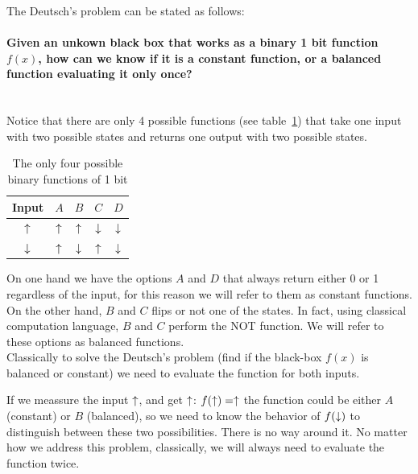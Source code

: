 The Deutsch's problem can be stated as follows:

\paragraph{Given an unkown black box that works as a binary 1 bit function $f(x)$, how can we know if it is a constant function, or a balanced function evaluating it only once?\\}
\textcolor{white}{.}\\
Notice that there are only 4 possible functions (see table~\ref{binfunc}) that take one input with two possible states and returns one output with two possible states.
\begin{table}[h!]
\begin{center}
\begin{tabular}{c|c|c|c|c}
\multicolumn{1}{l|}{Input} & \multicolumn{1}{l|}{$A$} & \multicolumn{1}{l|}{$B$} & \multicolumn{1}{l|}{$C$} & \multicolumn{1}{l}{$D$} \\ \hline
$\uparrow$ & $\uparrow$ & $\uparrow$ & $\downarrow$ & $\downarrow$ \\ %
$\downarrow$ & $\uparrow$ & $\downarrow$ & $\uparrow$ & $\downarrow$ \\ %
\end{tabular}
\end{center}
\vspace{-15pt}\caption{The only four possible binary functions of 1 bit}
\label{binfunc}
\end{table}

On one hand we have the options $A$ and $D$ that always return either 0 or 1 regardless of the input, for this reason we will refer to them as constant functions.
On the other hand, $B$ and $C$ flips or not one of the states. In fact, using classical computation language, $B$ and $C$ perform the NOT function. We will refer to these options as balanced functions.\\

Classically to solve the Deutsch's problem (find if the black-box $f(x)$ is balanced or constant) we need to evaluate the function for both inputs.

If we meassure the input $\uparrow$, and get $\uparrow$: $f(\uparrow)=\uparrow$ the function could be either $A$ (constant) or $B$ (balanced), so we need to know the behavior of $f(\downarrow)$ to distinguish between these two possibilities.
There is no way around it. No matter how we address this problem, classically, we will always need to evaluate the function twice.

